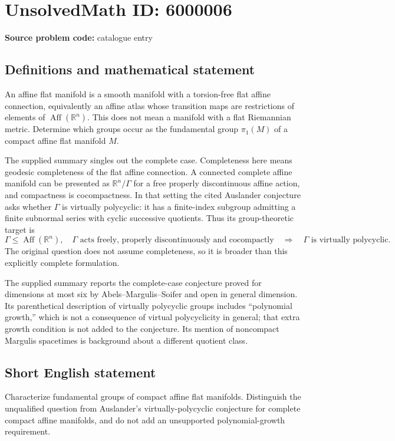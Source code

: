 \documentclass[11pt]{article}
\begin{document}
\section*{UnsolvedMath ID: 6000006}
\textbf{Source problem code:} catalogue entry
\subsection{Definitions and mathematical statement}
An affine flat manifold is a smooth manifold with a torsion-free flat affine connection, equivalently an affine atlas whose transition maps are restrictions of elements of $\operatorname{Aff}(\mathbb R^n)$. This does not mean a manifold with a flat Riemannian metric. Determine which groups occur as the fundamental group $\pi_1(M)$ of a compact affine flat manifold $M$.

The supplied summary singles out the complete case. Completeness here means geodesic completeness of the flat affine connection. A connected complete affine manifold can be presented as $\mathbb R^n/\Gamma$ for a free properly discontinuous affine action, and compactness is cocompactness. In that setting the cited Auslander conjecture asks whether $\Gamma$ is virtually polycyclic: it has a finite-index subgroup admitting a finite subnormal series with cyclic successive quotients. Thus its group-theoretic target is
\[
\Gamma\leq\operatorname{Aff}(\mathbb R^n),\quad
\Gamma\text{ acts freely, properly discontinuously and cocompactly}
\quad\Longrightarrow\quad\Gamma\text{ is virtually polycyclic}.
\]
The original question does not assume completeness, so it is broader than this explicitly complete formulation.

The supplied summary reports the complete-case conjecture proved for dimensions at most six by Abels--Margulis--Soifer and open in general dimension. Its parenthetical description of virtually polycyclic groups includes ``polynomial growth,'' which is not a consequence of virtual polycyclicity in general; that extra growth condition is not added to the conjecture. Its mention of noncompact Margulis spacetimes is background about a different quotient class.
\subsection{Short English statement}
Characterize fundamental groups of compact affine flat manifolds. Distinguish the unqualified question from Auslander's virtually-polycyclic conjecture for complete compact affine manifolds, and do not add an unsupported polynomial-growth requirement.
\end{document}
